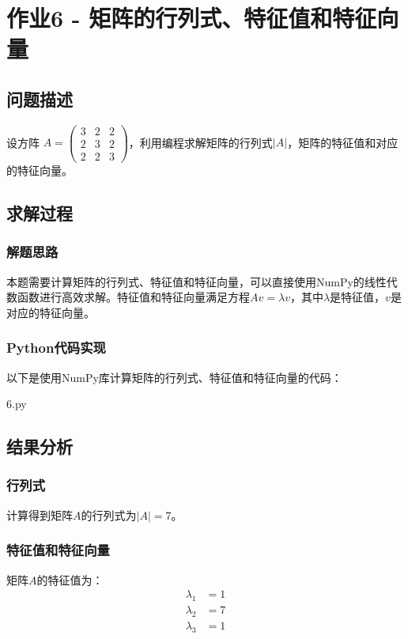\documentclass[bwprint]{cumcmthesis}
\begin{document}
\section{作业6 - 矩阵的行列式、特征值和特征向量}

\subsection{问题描述}
设方阵 $A = \begin{pmatrix} 3 & 2 & 2 \\ 2 & 3 & 2 \\ 2 & 2 & 3 \end{pmatrix}$，利用编程求解矩阵的行列式$|A|$，矩阵的特征值和对应的特征向量。

\subsection{求解过程}

\subsubsection{解题思路}
本题需要计算矩阵的行列式、特征值和特征向量，可以直接使用NumPy的线性代数函数进行高效求解。特征值和特征向量满足方程$Av = \lambda v$，其中$\lambda$是特征值，$v$是对应的特征向量。

\subsubsection{Python代码实现}
以下是使用NumPy库计算矩阵的行列式、特征值和特征向量的代码：

\noindent 6.py
    

\subsection{结果分析}

\subsubsection{行列式}
计算得到矩阵$A$的行列式为$|A| = 7$。

\subsubsection{特征值和特征向量}
矩阵$A$的特征值为：
\begin{align}
\lambda_1 &= 1 \\
\lambda_2 &= 7 \\
\lambda_3 &= 1
\end{align}
\end{document}
